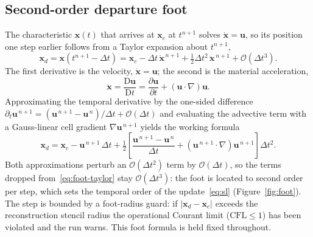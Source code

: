 \documentclass[preprint,3p,11pt]{elsarticle}
\newcommand{\xd}{\mathbf{x}_d}                    %
\newcommand{\xc}{\mathbf{x}_c}                    %
\newcommand{\uvec}{\mathbf{u}}
\begin{document}
\subsection{Second-order departure foot}
\label{sec:foot}
The characteristic $\mathbf{x}(t)$ that arrives at $\xc$ at $t^{n+1}$ solves
$\dot{\mathbf{x}}=\uvec$, so its position one step earlier follows from a Taylor
expansion about $t^{n+1}$,
\begin{equation}
  \xd = \mathbf{x}(t^{n+1}-\Delta t)
      = \xc - \Delta t\,\dot{\mathbf{x}}^{\,n+1}
            + \tfrac12\Delta t^{2}\,\ddot{\mathbf{x}}^{\,n+1}
            + \mathcal{O}(\Delta t^{3}).
  \label{eq:foot-taylor}
\end{equation}
The first derivative is the velocity, $\dot{\mathbf{x}}=\uvec$; the second is the
material acceleration,
\begin{equation}
  \ddot{\mathbf{x}} = \frac{\mathrm{D}\uvec}{\mathrm{D}t}
    = \frac{\partial\uvec}{\partial t} + (\uvec\cdot\nabla)\uvec .
  \label{eq:accel}
\end{equation}
Approximating the temporal derivative by the one-sided difference
$\partial_t\uvec^{\,n+1}=(\uvec^{\,n+1}-\uvec^{\,n})/\Delta t + \mathcal{O}(\Delta t)$ and
evaluating the advective term with a Gauss-linear cell gradient $\nabla\uvec^{\,n+1}$
yields the working formula
\begin{equation}
  \xd = \xc - \uvec^{\,n+1}\,\Delta t
        + \tfrac12\!\left[\frac{\uvec^{\,n+1}-\uvec^{\,n}}{\Delta t}
                 + \left(\uvec^{\,n+1}\!\cdot\nabla\right)\uvec^{\,n+1}\right]\!\Delta t^{2}.
  \label{eq:foot}
\end{equation}
Both approximations perturb an $\mathcal{O}(\Delta t^{2})$ term by
$\mathcal{O}(\Delta t)$, so the terms dropped from~\eqref{eq:foot-taylor} stay
$\mathcal{O}(\Delta t^{3})$: the foot is located to second order per step, which sets the
temporal order of the update~\eqref{eq:sl} (Figure~\ref{fig:foot}). The step is bounded
by a foot-radius guard: if $\lvert\xd-\xc\rvert$ exceeds the reconstruction stencil
radius the operational Courant limit ($\mathrm{CFL}\!\le\!1$) has been violated and the
run warns. This foot formula is held fixed throughout.
\end{document}
